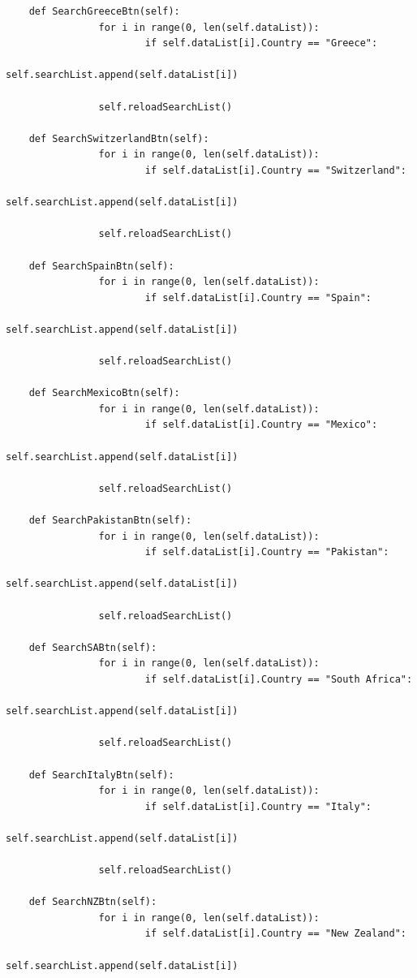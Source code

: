 \documentclass[12pt]{article}
\begin{document}
\begin{verbatim}
    def SearchGreeceBtn(self):
                for i in range(0, len(self.dataList)):
                        if self.dataList[i].Country == "Greece":
                                self.searchList.append(self.dataList[i])
                
                self.reloadSearchList()

    def SearchSwitzerlandBtn(self):
                for i in range(0, len(self.dataList)):
                        if self.dataList[i].Country == "Switzerland":
                                self.searchList.append(self.dataList[i])
                
                self.reloadSearchList()

    def SearchSpainBtn(self):
                for i in range(0, len(self.dataList)):
                        if self.dataList[i].Country == "Spain":
                                self.searchList.append(self.dataList[i])
                
                self.reloadSearchList()

    def SearchMexicoBtn(self):
                for i in range(0, len(self.dataList)):
                        if self.dataList[i].Country == "Mexico":
                                self.searchList.append(self.dataList[i])
                
                self.reloadSearchList()

    def SearchPakistanBtn(self):
                for i in range(0, len(self.dataList)):
                        if self.dataList[i].Country == "Pakistan":
                                self.searchList.append(self.dataList[i])
                
                self.reloadSearchList()

    def SearchSABtn(self):
                for i in range(0, len(self.dataList)):
                        if self.dataList[i].Country == "South Africa":
                                self.searchList.append(self.dataList[i])
                
                self.reloadSearchList()

    def SearchItalyBtn(self):
                for i in range(0, len(self.dataList)):
                        if self.dataList[i].Country == "Italy":
                                self.searchList.append(self.dataList[i])
                
                self.reloadSearchList()

    def SearchNZBtn(self):
                for i in range(0, len(self.dataList)):
                        if self.dataList[i].Country == "New Zealand":
                                self.searchList.append(self.dataList[i])
                

\end{verbatim}
\end{document}
